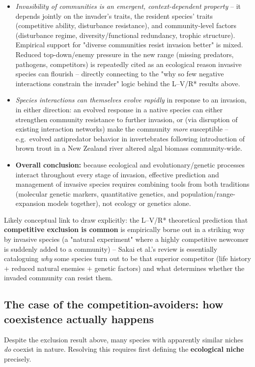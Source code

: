 \documentclass[11pt,a4paper]{article}
\begin{document}
\begin{papbox}[title={Paper Summary: Sakai, Allendorf, Holt et al. (2001), \textit{Annu. Rev. Ecol. Syst.} 32:305--332 -- ``The Population Biology of Invasive Species''}]
\begin{itemize}[leftmargin=1.3em,nosep]
\item \emph{Invasibility of communities is an emergent, context-dependent property} -- it depends jointly on the invader's traits, the resident species' traits (competitive ability, disturbance resistance), and community-level factors (disturbance regime, diversity/functional redundancy, trophic structure). Empirical support for "diverse communities resist invasion better" is mixed. Reduced top-down/enemy pressure in the new range (missing predators, pathogens, competitors) is repeatedly cited as an ecological reason invasive species can flourish -- directly connecting to the "why so few negative interactions constrain the invader" logic behind the L--V/R* results above.
\item \emph{Species interactions can themselves evolve rapidly} in response to an invasion, in either direction: an evolved response in a native species can either strengthen community resistance to further invasion, or (via disruption of existing interaction networks) make the community \emph{more} susceptible -- e.g.\ evolved antipredator behavior in invertebrates following introduction of brown trout in a New Zealand river altered algal biomass community-wide.
\item \textbf{Overall conclusion:} because ecological and evolutionary/genetic processes interact throughout every stage of invasion, effective prediction and management of invasive species requires combining tools from both traditions (molecular genetic markers, quantitative genetics, and population/range-expansion models together), not ecology or genetics alone.
\end{itemize}
\end{papbox}

\begin{exambox}
Likely conceptual link to draw explicitly: the L--V/R* theoretical prediction that \textbf{competitive exclusion is common} is empirically borne out in a striking way by invasive species (a "natural experiment" where a highly competitive newcomer is suddenly added to a community) -- Sakai et al.'s review is essentially cataloguing \emph{why} some species turn out to be that superior competitor (life history $+$ reduced natural enemies $+$ genetic factors) and what determines whether the invaded community can resist them.
\end{exambox}

\subsection{The case of the competition-avoiders: how coexistence actually happens}
Despite the exclusion result above, many species with apparently similar niches \emph{do} coexist in nature. Resolving this requires first defining the \textbf{ecological niche} precisely.
\end{document}
